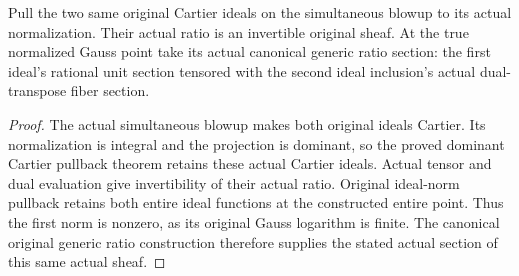 \begin{definition}
\label{def:actual-original-normalized-simultaneous-ratio-line}
\leanok
{}
Pull the two same original Cartier ideals on the simultaneous blowup to its
actual normalization. Their actual ratio is an invertible original sheaf.
At the true normalized Gauss point take its actual canonical generic ratio
section: the first ideal's rational unit section tensored with the second
ideal inclusion's actual dual-transpose fiber section.
\end{definition}
\begin{proof}
The actual simultaneous blowup makes both original ideals Cartier. Its
normalization is integral and the projection is dominant, so the proved
dominant Cartier pullback theorem retains these actual Cartier ideals.
Actual tensor and dual evaluation give invertibility of their actual ratio.
Original ideal-norm pullback retains both entire ideal functions at the
constructed entire point. Thus the first norm is nonzero, as its original
Gauss logarithm is finite. The canonical original generic ratio construction
therefore supplies the stated actual section of this same actual sheaf.
\end{proof}

